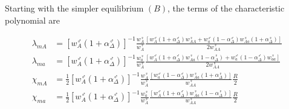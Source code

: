 \documentclass[12pt]{article}
\begin{document}
Starting with the simpler equilibrium $(B)$, the terms of the characteristic polynomial are

\begin{subequations}\label{Binvasion}
\begin{align}
\lambda_{mA}&= \left[w_{A}^\male (1+\alpha^\male_\Delta) \right]^{-1}
\frac{w_{A}^\female }{w_{A}^\female}
\frac{\left[ w_{A}^\male (1+\alpha^\male_\Delta) w_{AA}^\female + 
w_{a}^\male (1-\alpha^\male_\Delta) w_{Aa}^\female (1+\alpha^\female_\Delta) \right]}
{ 2w_{AA}^\female } \\
\lambda_{ma}&= \left[w_{A}^\male (1+\alpha^\male_\Delta) \right]^{-1}
\frac{w_{a}^\female}{w_{A}^\female}
\frac{\left[  w_{A}^\male (1+\alpha^\male_\Delta) w_{Aa}^\female (1-\alpha^\female_\Delta)+
w_{a}^\male (1-\alpha^\male_\Delta) w_{aa}^\female \right]}
{ 2w_{AA}^\female } \\
\chi_{mA}&= \frac{1}{2} \left[w_{A}^\male (1+\alpha^\male_\Delta) \right]^{-1}
\frac{w_{A}^\female }{w_{A}^\female}
 \frac{\left[  w_{a}^\male (1-\alpha^\male_\Delta) w_{Aa}^\female (1 + \alpha^\female_\Delta) \right]}
{ w_{AA}^\female } \frac{R}{2}\\
\chi_{ma}&= \frac{1}{2} \left[w_{A}^\male (1+\alpha^\male_\Delta) \right]^{-1}
\frac{w_{a}^\female}{w_{A}^\female}
 \frac{\left[  w_{A}^\male (1+\alpha^\male_\Delta) w_{Aa}^\female (1-\alpha^\female_\Delta) \right]}
{  w_{AA}^\female} \frac{R}{2}
\end{align}
\end{subequations}
\end{document}
